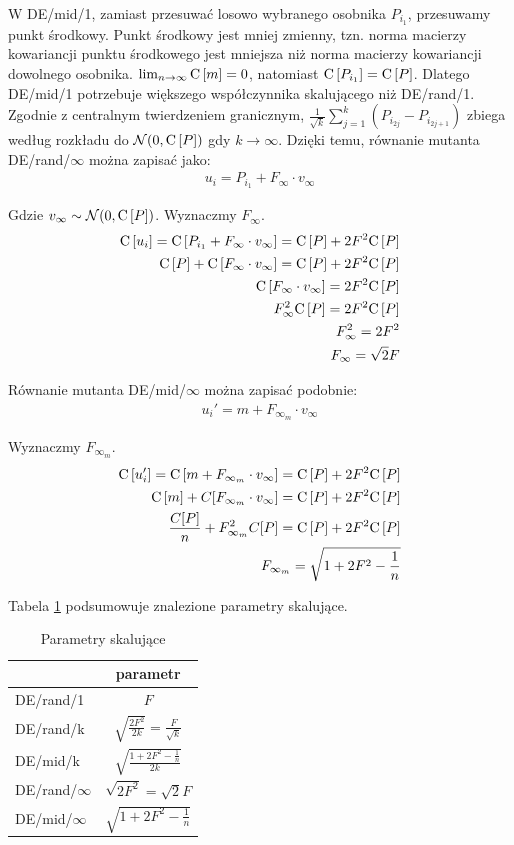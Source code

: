 \documentclass[12pt, a4paper]{article}
\def\C{{\rm C}\,}
\begin{document}
W DE/mid/1, zamiast przesuwać losowo wybranego osobnika $P_{i_1}$, przesuwamy punkt środkowy.
Punkt środkowy jest mniej zmienny, 
tzn. norma macierzy kowariancji punktu środkowego jest mniejsza niż norma macierzy kowariancji dowolnego osobnika.
$\lim_{n\to\infty} \C[m] = 0$, natomiast $\C[P_{i_1}] = \C[P]$.
Dlatego DE/mid/1 potrzebuje większego współczynnika skalującego niż DE/rand/1. \\

Zgodnie z centralnym twierdzeniem granicznym, $\frac{1}{{\sqrt{k}}}\sum\limits_{j=1}^k (P_{i_{2j}} - P_{i_{2j+1}})$ 
zbiega według rozkładu do $\mathcal{N}(0, \C[P])$ gdy $k \to \infty$. 
Dzięki temu, równanie mutanta DE/rand/$\infty$ można zapisać jako:
\begin{align*}
u_i = P_{i_1} + F_\infty \cdot v_\infty
\end{align*}

Gdzie $v_\infty \sim \mathcal{N}(0, \C[P])$. Wyznaczmy $F_\infty$.
\begin{align*}
\C[u_i] = \C[P_{i_1} + F_\infty \cdot v_\infty] = \C[P] + 2F^2\C[P] \\
\C[P] + \C[F_\infty \cdot v_\infty] = \C[P] + 2F^2\C[P] \\
\C[F_\infty \cdot v_\infty] = 2F^2\C[P] \\
F_\infty^2 \C[P] = 2F^2\C[P] \\
F_\infty^2 = 2F^2 \\
F_\infty = \sqrt{2}F
\end{align*}

Równanie mutanta DE/mid/$\infty$ można zapisać podobnie:
\begin{align*}
u_i' = m + F_{\infty_m} \cdot v_\infty
\end{align*}

Wyznaczmy $F_{\infty_m}$.
\begin{align*}
\C[u_i'] = \C[m + F_{\infty_m} \cdot v_\infty] = \C[P] + 2F^2\C[P] \\
\C[m] + C[F_{\infty_m} \cdot v_\infty] = \C[P] + 2F^2\C[P] \\
\frac{C[P]}{n} + F_{\infty_m}^2 C[P] = \C[P] + 2F^2\C[P] \\
F_{\infty_m} = \sqrt{1 + 2F^2 - \frac{1}{n}}
\end{align*}

Tabela \ref{table:parametry} podsumowuje znalezione parametry skalujące.

\begin{table}[H]
\centering
\begin{tabular}{ l | c }
                 & parametr \\ \hline
DE/rand/1        & $F$ \\ 
DE/rand/k        & $\sqrt{\frac{2F^2}{2k}} = \frac{F}{\sqrt{k}}$ \\ 
DE/mid/k         & $\sqrt{\frac{1 + 2F^2 - \frac{1}{n}}{2k}}$ \\
DE/rand/$\infty$ & $\sqrt{2F^2} = \sqrt{2}F$ \\ 
DE/mid/$\infty$  & $\sqrt{1 + 2F^2 - \frac{1}{n}}$ \\
\end{tabular}
\caption{Parametry skalujące}
\label{table:parametry}
\end{table}
\end{document}
